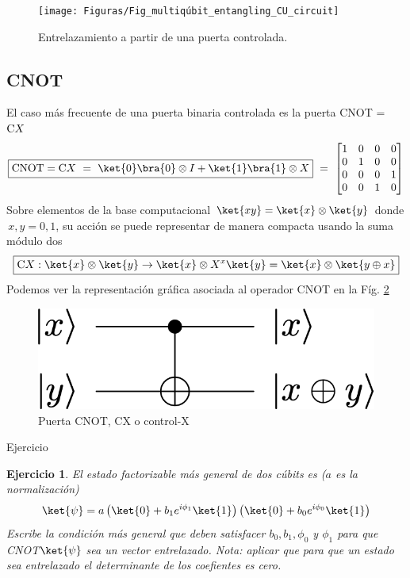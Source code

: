 \documentclass[a4paper,11pt]{book} %
\newtheorem{ejercicio_contador}{Ejercicio}
\newcommand{\Ejercicio}[1]{
		\begin{mybox_gray}{Ejercicio} 
			\begin{ejercicio_contador}
				 #1 
			\end{ejercicio_contador} 
		\end{mybox_gray}
	}
\numberwithin{equation}{chapter}
\def\lp{\left(}
\def\rp{\right)}
\newcommand{\cg}[1]{{\rm C}#1}
\begin{document}
	\begin{figure}[H]
	\centering 
	\texttt{[image: Figuras/Fig\_multiqúbit\_entangling\_CU\_circuit]}
	\caption{Entrelazamiento a partir de una puerta controlada.}
	\label{Fig_multiqúbit_entangling_CU_circuit}
	\end{figure}


        \subsection{CNOT} 
	
El caso más frecuente de una puerta binaria controlada es la puerta CNOT = $\cg{X}$
	\begin{equation} \label{ec_multiqubit_CNOT}
	\boxed{\hbox{CNOT} = \cg{X} ~=~ \ket{0}\bra{0}\otimes I + \ket{1}\bra{1}\otimes X }
	~=~ \begin{bmatrix} 1 & 0 & 0 & 0 \\ 0 & 1 & 0 & 0 \\ 0 & 0 & 0 & 1 \\ 0 & 0 & 1 & 0\end{bmatrix}
	\end{equation}
Sobre elementos de la base computacional $\ket{xy}=\ket{x}\otimes\ket{y}$ donde $\, x,y= 0,1$, su acción  se puede representar de manera compacta usando la suma módulo dos 
	\begin{equation} \label{ec_multiqubit_CNOT_compu}
	\boxed{\cg{X}:\ket{x}\otimes\ket{y} \rightarrow \ket{x} \otimes X^x\ket{y} = \ket{x} \otimes \ket{y\oplus x}}
	\end{equation}
Podemos ver la representación gráfica asociada al operador CNOT en la Fíg. \ref{Fig_multiqubit_cX_gate}
	\begin{figure}[H]
	\centering 
	\includegraphics[width=0.25\linewidth]{Figuras/Fig_multiqubit_cX_gate}
	\caption{Puerta CNOT, CX o control-X}
	\label{Fig_multiqubit_cX_gate}
	\end{figure}

	\Ejercicio{El estado factorizable más general de dos cúbits es ($a$ es la normalización)
	$$
	\ket{\psi} = a \left(\ket{0} + b_1 e^{i\phi_1}\ket{1} \rp \lp \ket{0} + b_0 e^{i\phi_0} \ket{1} \right) 
	$$
	Escribe la condición más general que deben satisfacer  $b_0,b_1,\phi_0$ y $\phi_1$ para que CNOT$\ket{\psi}$ 
	sea un vector entrelazado. Nota: aplicar que para que un estado sea entrelazado el determinante de los coefientes es cero.}
\end{document}
